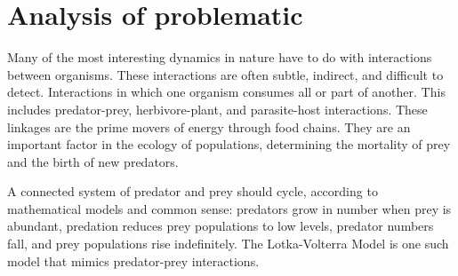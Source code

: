 \chapter{Analysis of problematic} \label{chap:astronomicaldata}


Many of the most interesting dynamics in nature have to do with interactions between organisms. These interactions are often subtle, indirect, and difficult to detect. Interactions in which one organism consumes all or part of another. This includes predator-prey, herbivore-plant, and parasite-host interactions. These linkages are the prime movers of energy through food chains. They are an important factor in the ecology of populations, determining the mortality of prey and the birth of new predators.

A connected system of predator and prey should cycle, according to mathematical models and common sense: predators grow in number when prey is abundant, predation reduces prey populations to low levels, predator numbers fall, and prey populations rise indefinitely. The Lotka-Volterra Model is one such model that mimics predator-prey interactions.






